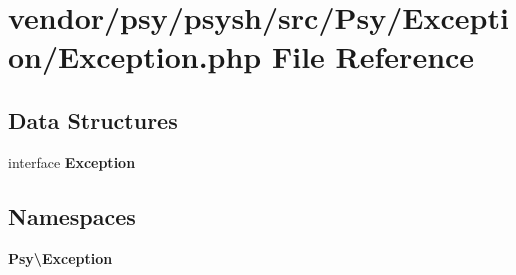 \section{vendor/psy/psysh/src/\+Psy/\+Exception/\+Exception.php File Reference}
\label{psy_2psysh_2src_2_psy_2_exception_2_exception_8php}
\subsection*{Data Structures}
\begin{DoxyCompactItemize}
\item 
interface {\bf Exception}
\end{DoxyCompactItemize}
\subsection*{Namespaces}
\begin{DoxyCompactItemize}
\item 
 {\bf Psy\textbackslash{}\+Exception}
\end{DoxyCompactItemize}
